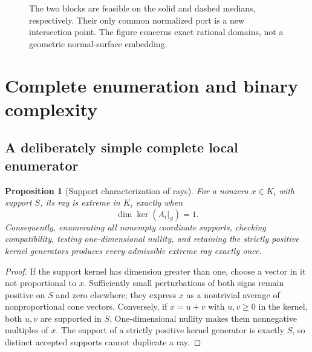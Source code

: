 \documentclass[11pt,a4paper]{article}
\newtheorem{proposition}[theorem]{Proposition}
\theoremstyle{definition}
\theoremstyle{remark}
\begin{document}
\begin{figure}[ht]
\centering
{}
\caption{The two blocks are feasible on the solid and dashed medians, respectively. Their only common normalized port is a new intersection point. The figure concerns exact rational domains, not a geometric normal-surface embedding.}
\end{figure}

\section{Complete enumeration and binary complexity}
\label{sec:complexity}

\subsection{A deliberately simple complete local enumerator}
\begin{proposition}[Support characterization of rays]
\label{prop:support}
For a nonzero $x\in K_i$ with support $S$, its ray is extreme in $K_i$ exactly when
\[
 \dim\ker(A_i|_S)=1.
\]
Consequently, enumerating all nonempty coordinate supports, checking compatibility, testing one-dimensional nullity, and retaining the strictly positive kernel generators produces every admissible extreme ray exactly once.
\end{proposition}
\begin{proof}
If the support kernel has dimension greater than one, choose a vector in it not proportional to $x$. Sufficiently small perturbations of both signs remain positive on $S$ and zero elsewhere; they express $x$ as a nontrivial average of nonproportional cone vectors. Conversely, if $x=u+v$ with $u,v\ge0$ in the kernel, both $u,v$ are supported in $S$. One-dimensional nullity makes them nonnegative multiples of $x$. The support of a strictly positive kernel generator is exactly $S$, so distinct accepted supports cannot duplicate a ray.
\end{proof}
\end{document}
